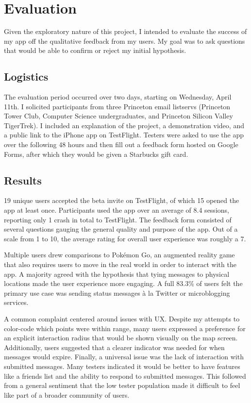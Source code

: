 \section{Evaluation}

Given the exploratory nature of this project, I intended to evaluate the success of my app off the qualitative feedback from my users. My goal was to ask questions that would be able to confirm or reject my initial hypothesis.

\subsection{Logistics}

The evaluation period occurred over two days, starting on Wednesday, April 11th. I solicited participants from three Princeton email listservs (Princeton Tower Club, Computer Science undergraduates, and Princeton Silicon Valley TigerTrek). I included an explanation of the project, a demonstration video, and a public link to the iPhone app on TestFlight. Testers were asked to use the app over the following 48 hours and then fill out a feedback form hosted on Google Forms, after which they would be given a Starbucks gift card.

\subsection{Results}

19 unique users accepted the beta invite on TestFlight, of which 15 opened the app at least once. Participants used the app over an average of 8.4 sessions, reporting only 1 crash in total to TestFlight. The feedback form consisted of several questions gauging the general quality and purpose of the app. Out of a scale from 1 to 10, the average rating for overall user experience was roughly a 7.

Multiple users drew comparisons to Pokémon Go, an augmented reality game that also requires users to move in the real world in order to interact with the app. A majority agreed with the hypothesis that tying messages to physical locations made the user experience more engaging. A full 83.3\% of users felt the primary use case was sending status messages à la Twitter or microblogging services.

A common complaint centered around issues with \textsc{UX}. Despite my attempts to color-code which points were within range, many users expressed a preference for an explicit interaction radius that would be shown visually on the map screen. Additionally, users suggested that a clearer indicator was needed for when messages would expire. Finally, a universal issue was the lack of interaction with submitted messages. Many testers indicated it would be better to have features like a friends list and the ability to respond to submitted messages. This followed from a general sentiment that the low tester population made it difficult to feel like part of a broader community of users.

